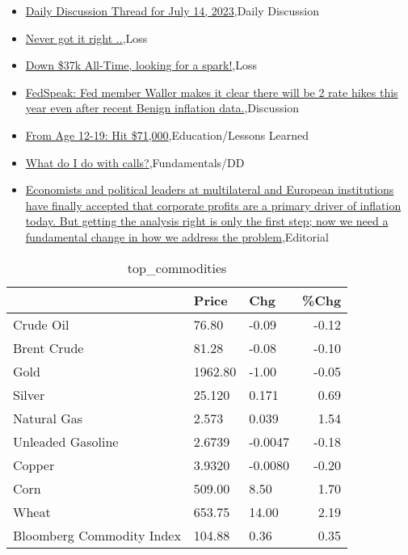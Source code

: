 \documentclass{article}%
\begin{document}
%
\begin{itemize}%
\item%
\href{https://reddit.com/r/wallstreetbets/comments/14zc8zd/daily\_discussion\_thread\_for\_july\_14\_2023/}{Daily Discussion Thread for July 14, 2023},Daily Discussion%
\item%
\href{https://reddit.com/r/wallstreetbets/comments/14zaiz7/never\_got\_it\_right/}{Never got it right ..},Loss%
\item%
\href{https://reddit.com/r/wallstreetbets/comments/14z9ion/down\_37k\_alltime\_looking\_for\_a\_spark/}{Down \$37k All-Time, looking for a spark!},Loss%
\item%
\href{https://reddit.com/r/StockMarket/comments/14z0mo5/fedspeak\_fed\_member\_waller\_makes\_it\_clear\_there/}{FedSpeak: Fed member Waller makes it clear there will be 2 rate hikes this year even after recent Benign inflation data.},Discussion%
\item%
\href{https://reddit.com/r/StockMarket/comments/14ywsb0/from\_age\_1219\_hit\_71000/}{From Age 12-19: Hit \$71,000},Education/Lessons Learned%
\item%
\href{https://reddit.com/r/StockMarket/comments/14yvph3/what\_do\_i\_do\_with\_calls/}{What do I do with calls?},Fundamentals/DD%
\item%
\href{https://reddit.com/r/Economics/comments/14yw6n3/economists\_and\_political\_leaders\_at\_multilateral/}{Economists and political leaders at multilateral and European institutions have finally accepted that corporate profits are a primary driver of inflation today. But getting the analysis right is only the first step; now we need a fundamental change in how we address the problem},Editorial%
\end{itemize}%


\begin{table}[htbp]%
\caption{top\_commodities}%
\centering%
\begin{adjustbox}{width=1\textwidth}%
\begin{tabular}{lllr}
\toprule
                          &   Price &     Chg &  \%Chg \\
\midrule
               Crude Oil  &   76.80 &   -0.09 & -0.12 \\
             Brent Crude  &   81.28 &   -0.08 & -0.10 \\
                    Gold  & 1962.80 &   -1.00 & -0.05 \\
                  Silver  &  25.120 &   0.171 &  0.69 \\
             Natural Gas  &   2.573 &   0.039 &  1.54 \\
       Unleaded Gasoline  &  2.6739 & -0.0047 & -0.18 \\
                  Copper  &  3.9320 & -0.0080 & -0.20 \\
                    Corn  &  509.00 &    8.50 &  1.70 \\
                   Wheat  &  653.75 &   14.00 &  2.19 \\
Bloomberg Commodity Index &  104.88 &    0.36 &  0.35 \\
\bottomrule
\end{tabular}
%
\end{adjustbox}%
\end{table}
\end{document}
